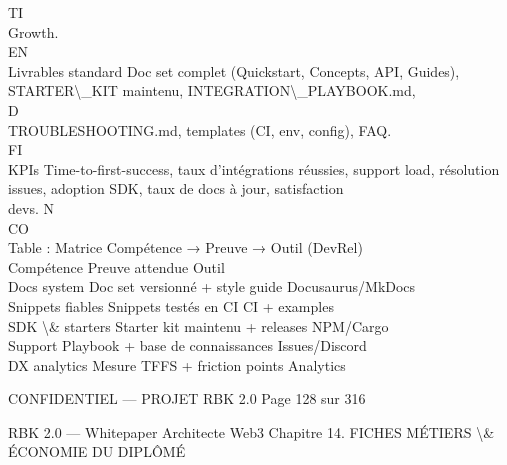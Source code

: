 \documentclass[12pt,landscape,a4paper]{article}
\newenvironment{confidential}
{\begin{tcolorbox}[
    colback=rbkred!5!white,
    colframe=rbkred!75!black,
    title=CONFIDENTIEL,
    fonttitle=\bfseries\color{white},
    coltitle=rbkred!75!black,
    breakable,
    enhanced,
    frame hidden,
    borderline west={2pt}{0pt}{rbkred!75!black}
]}
{\end{tcolorbox}}
\begin{document}
\vspace{0.5em}
\vspace{0.5em}
\vspace{0.5em}
\vspace{0.5em}
TI\\
Growth.\\
\vspace{0.5em}
\vspace{0.5em}
\vspace{0.5em}
\vspace{0.5em}
EN\\
Livrables standard  Doc set complet (Quickstart, Concepts, API, Guides), STARTER\textbackslash{}_KIT maintenu, INTEGRATION\textbackslash{}_PLAYBOOK.md,\\
\vspace{0.5em}
\vspace{0.5em}
\vspace{0.5em}
\vspace{0.5em}
D\\
TROUBLESHOOTING.md, templates (CI, env, config), FAQ.\\
\vspace{0.5em}
\vspace{0.5em}
\vspace{0.5em}
\vspace{0.5em}
FI\\
KPIs Time-to-first-success, taux d’intégrations réussies, support load, résolution issues, adoption SDK, taux de docs à jour, satisfaction\\
devs.                                            N\\
CO\\
Table : Matrice Compétence → Preuve → Outil (DevRel)\\
\vspace{0.5em}
Compétence       Preuve attendue                  Outil\\
Docs system      Doc set versionné + style guide  Docusaurus/MkDocs\\
Snippets fiables Snippets testés en CI            CI + examples\\
SDK \textbackslash{}& starters Starter kit maintenu + releases    NPM/Cargo\\
Support          Playbook + base de connaissances Issues/Discord\\
DX analytics     Mesure TFFS + friction points    Analytics\\
\vspace{0.5em}
\vspace{0.5em}
\vspace{0.5em}
\vspace{0.5em}
\begin{confidential}CONFIDENTIEL — PROJET RBK 2.0                               Page 128 sur 316\end{confidential}
RBK 2.0 — Whitepaper Architecte Web3                                                   Chapitre 14. FICHES MÉTIERS \textbackslash{}& ÉCONOMIE DU DIPLÔMÉ\\
\vspace{0.5em}
\vspace{0.5em}
\vspace{0.5em}
\end{document}
